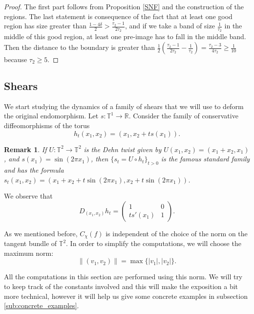\documentclass[11pt,letterpaper,reqno]{article}
\newtheorem{remark}{Remark}[section]
\newcommand{\Tor}{\mathbb{T}^2}
\newcommand{\TT}{\mathbb{T}^2}
\begin{document}
\begin{proof}
    The first part follows from Proposition \ref{SNF} and the construction of the regions.  The last statement is consequence of the fact that at least one good region has size greater than $\frac{1-4\delta}2>\frac {\tau_2-1}{2\tau_2}$, and if we take a band of size $\frac 1{\tau_2}$ in the middle of this good region, at least one pre-image has to fall in the middle band. Then the distance to the boundary is greater than $\frac 12\left(\frac{\tau_2-1}{2\tau_2}-\frac 1{\tau_2}\right)=\frac{\tau_2-3}{4\tau_2}\geq \frac 1{10}$ because $\tau_2\geq 5$.
\end{proof}

\subsection{Shears}
\label{sub:shears}


We start studying the dynamics of a family of shears that we will use to deform the original endomorphism. Let $s:\mathbb T^1\rightarrow\mathbb R$. Consider the family of conservative diffeomorphisms of the torus
\begin{equation}
	h_t(x_1,x_2)=(x_1, x_2+ts(x_1)).
\end{equation}

\begin{remark}\label{rem:standard}
If $U:\Tor\to\Tor$ is the Dehn twist given by $U(x_1,x_2)=(x_1+x_2,x_1)$, and $s(x_1)=\sin(2\pi x_1)$, then $\{s_t=U\circ h_t\}_{t>0}$ is the famous \emph{standard family} \cite{Chirikov2008} and has the formula $s_t(x_1,x_2)=(x_1+x_2+t\sin(2\pi x_1), x_2+t\sin(2\pi x_1))$.
\end{remark}

We observe that
\begin{equation}
	D_{(x_1,x_2)}h_t=\begin{pmatrix}
	1 & 0\\
	ts'(x_1) & 1
	\end{pmatrix}.
\end{equation}


As we mentioned before, $C_{\chi}(f)$ is independent of the choice of the norm on the tangent bundle of $\TT$. In order to simplify the computations, we will choose the maximum norm:
$$
\|(v_1,v_2)\|=\max\{|v_1|,|v_2|\}.
$$

All the computations in this section are performed using this norm. We will try to keep track of the constants involved and this will make the exposition a bit more technical, however it will help us give some concrete examples in subsection \ref{sub:concrete_examples}.
\end{document}

